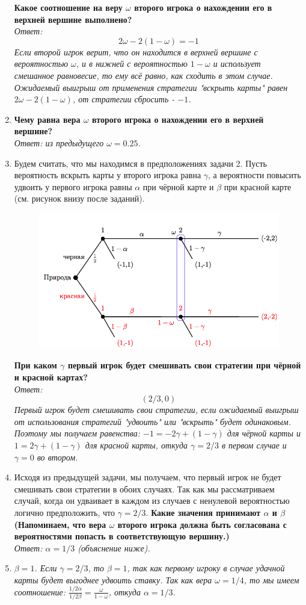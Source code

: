 \documentclass[a4paper,12pt]{article}
\begin{document}
\begin{enumerate}
	\textbf{Какое соотношение на веру $\omega$ второго игрока о нахождении его в верхней вершине выполнено?}\\
	\textit{Ответ: $$2\omega-2(1-\omega) = -1$$ Если второй игрок верит, что он находится в верхней вершине с вероятностью $\omega$, и в нижней с вероятностью $1-\omega$ и использует смешанное равновесие, то ему всё равно, как сходить в этом случае. Ожидаемый выигрыш от применения стратегии "вскрыть карты" равен $2\omega-2(1-\omega)$, от стратегии сбросить - $-1$.}
	\item \textbf{Чему равна вера $\omega$ второго игрока о нахождении его в верхней вершине?}\\
	\textit{Ответ: из предыдущего $\omega = 0.25$.}
	\item Будем считать, что мы находимся в предположениях задачи 2. Пусть вероятность вскрыть карты у второго игрока равна $\gamma$, а вероятности повысить удвоить у первого игрока равны $\alpha$ при чёрной карте и $\beta$ при красной карте (см. рисунок внизу после заданий).
	\begin{figure}[h!]
		\centering
		\includegraphics[width=0.7\linewidth]{wVBHNifgEeak5wpS_JmWWw_6fbbaac5a5e6813956346cf1ffe95c35_w06_test5}
		\caption{}
		\label{fig:wvbhnifgeeak5wpsjmwww6fbbaac5a5e6813956346cf1ffe95c35w06test5}
	\end{figure}

	\textbf{При каком $\gamma$ первый игрок будет смешивать свои стратегии при чёрной и красной картах?}\\
	\textit{Ответ: $$(2/3, 0)$$ Первый игрок будет смешивать свои стратегии, если ожидаемый выигрыш от использования стратегий "удвоить" или "вскрыть" будет одинаковым. Поэтому мы получаем равенства: $-1=-2\gamma+(1-\gamma)$ для чёрной карты и $1=2\gamma+(1-\gamma)$ для красной карты, откуда $\gamma=2/3$ в первом случае и $\gamma=0$ во втором.}
	\item Исходя из предыдущей задачи, мы получаем, что первый игрок не будет смешивать свои стратегии в обоих случаях. Так как мы рассматриваем случай, когда он удваивает в каждом из случаев с ненулевой вероятностью логично предположить, что $\gamma=2/3$. \textbf{Какие значения принимают $\alpha$ и $\beta$ (Напоминаем, что вера $\omega$ второго игрока должна быть согласована с вероятностями попасть в соответствующую вершину.)}\\
	\textit{Ответ: $\alpha = 1/3$ (объяснение ниже). }
	\item \textit{$\beta = 1$. Если $\gamma=2/3$, то $\beta = 1$, так как первому игроку в случае удачной карты будет выгоднее удвоить ставку. Так как вера $\omega = 1/4$, то мы имеем соотношение: $\frac{1/2\alpha}{1/2\beta} = \frac{\omega}{1-\omega}$, откуда $\alpha = 1/3$.}
\end{enumerate}
\end{document}
